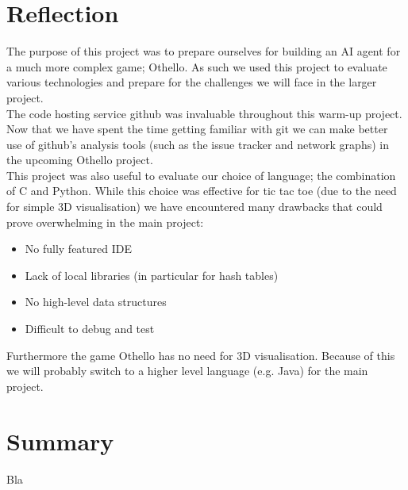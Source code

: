 \documentclass[10pt,twocolumn]{article}
\begin{document}
\section{Reflection}
The purpose of this project was to prepare ourselves for building an AI agent for
a much more complex game; Othello. As such we used this project to evaluate various
technologies and prepare for the challenges we will face in the larger project.\\
The code hosting service github was invaluable throughout this warm-up
project. Now that we have spent the time getting familiar with git
we can make better use of github's analysis tools (such as
the issue tracker and network graphs) in the upcoming Othello project.\\
This project was also useful to evaluate our choice of language; the combination
of C and Python. While this choice was effective for tic tac toe (due to the
need for simple 3D visualisation) we have encountered many drawbacks that 
could prove overwhelming in the main project:
\begin{itemize}
\item No fully featured IDE
\item Lack of local libraries (in particular for hash tables)
\item No high-level data structures
\item Difficult to debug and test
\end{itemize}
Furthermore the game Othello has no need for 3D visualisation. Because of this
we will probably switch to a higher level language (e.g. Java) for the main
project.

\section{Summary}
Bla



\end{document}
